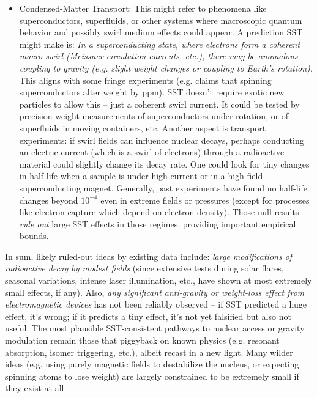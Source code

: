 \documentclass[11pt]{article}
\begin{document}
\begin{itemize}
\item 
Condensed-Matter Transport: This might refer to phenomena like superconductors, superfluids, or other systems where macroscopic quantum behavior and possibly swirl medium effects could appear. A prediction SST might make is: \textit{In a superconducting state, where electrons form a coherent macro-swirl (Meissner circulation currents, etc.), there may be anomalous coupling to gravity (e.g. slight weight changes or coupling to Earth’s rotation).} This aligns with some fringe experiments (e.g. claims that spinning superconductors alter weight by ppm). SST doesn’t require exotic new particles to allow this – just a coherent swirl current. It could be tested by precision weight measurements of superconductors under rotation, or of superfluids in moving containers, etc. Another aspect is transport experiments: if swirl fields can influence nuclear decays, perhaps conducting an electric current (which is a swirl of electrons) through a radioactive material could slightly change its decay rate. One could look for tiny changes in half-life when a sample is under high current or in a high-field superconducting magnet. Generally, past experiments have found no half-life changes beyond $10^{-4}$ even in extreme fields or pressures (except for processes like electron-capture which depend on electron density). Those null results \textit{rule out} large SST effects in those regimes, providing important empirical bounds.




\end{itemize}

In sum, likely ruled-out ideas by existing data include: \textit{large modifications of radioactive decay by modest fields} (since extensive tests during solar flares, seasonal variations, intense laser illumination, etc., have shown at most extremely small effects, if any). Also, \textit{any significant anti-gravity or weight-loss effect from electromagnetic devices} has not been reliably observed – if SST predicted a huge effect, it’s wrong; if it predicts a tiny effect, it’s not yet falsified but also not useful. The most plausible SST-consistent pathways to nuclear access or gravity modulation remain those that piggyback on known physics (e.g. resonant absorption, isomer triggering, etc.), albeit recast in a new light. Many wilder ideas (e.g. using purely magnetic fields to destabilize the nucleus, or expecting spinning atoms to lose weight) are largely constrained to be extremely small if they exist at all.
\end{document}
